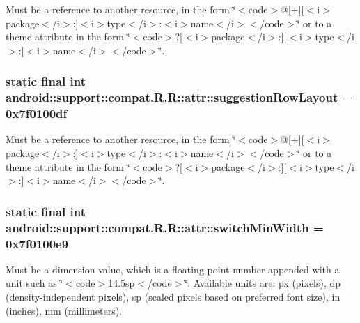 Must be a reference to another resource, in the form \char`\"{}$<$code$>$@\mbox{[}+\mbox{]}\mbox{[}$<$i$>$package$<$/i$>$:\mbox{]}$<$i$>$type$<$/i$>$:$<$i$>$name$<$/i$>$$<$/code$>$\char`\"{} or to a theme attribute in the form \char`\"{}$<$code$>$?\mbox{[}$<$i$>$package$<$/i$>$:\mbox{]}\mbox{[}$<$i$>$type$<$/i$>$:\mbox{]}$<$i$>$name$<$/i$>$$<$/code$>$\char`\"{}. \hypertarget{classandroid_1_1support_1_1compat_1_1_r_1_1attr_28f5ff97cd60c198dee2185bf1e0e71e}{
\subsubsection[{suggestionRowLayout}]{\setlength{\rightskip}{0pt plus 5cm}static final int android::support::compat.R.R::attr::suggestionRowLayout = 0x7f0100df}}
\label{classandroid_1_1support_1_1compat_1_1_r_1_1attr_28f5ff97cd60c198dee2185bf1e0e71e}


Must be a reference to another resource, in the form \char`\"{}$<$code$>$@\mbox{[}+\mbox{]}\mbox{[}$<$i$>$package$<$/i$>$:\mbox{]}$<$i$>$type$<$/i$>$:$<$i$>$name$<$/i$>$$<$/code$>$\char`\"{} or to a theme attribute in the form \char`\"{}$<$code$>$?\mbox{[}$<$i$>$package$<$/i$>$:\mbox{]}\mbox{[}$<$i$>$type$<$/i$>$:\mbox{]}$<$i$>$name$<$/i$>$$<$/code$>$\char`\"{}. \hypertarget{classandroid_1_1support_1_1compat_1_1_r_1_1attr_41bfe2bfc94e266001368719cf8f364d}{
\subsubsection[{switchMinWidth}]{\setlength{\rightskip}{0pt plus 5cm}static final int android::support::compat.R.R::attr::switchMinWidth = 0x7f0100e9}}
\label{classandroid_1_1support_1_1compat_1_1_r_1_1attr_41bfe2bfc94e266001368719cf8f364d}


Must be a dimension value, which is a floating point number appended with a unit such as \char`\"{}$<$code$>$14.5sp$<$/code$>$\char`\"{}. Available units are: px (pixels), dp (density-independent pixels), sp (scaled pixels based on preferred font size), in (inches), mm (millimeters). 

